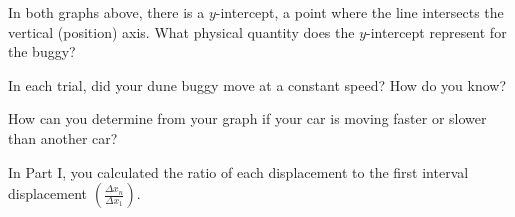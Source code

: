 \documentclass[]{exam}
\begin{document}
\begin{questions}
\ifprintanswers 
\else \fillwithlines{14mm}
\fi

\question
In both graphs above, there is a $y$-intercept, a point where the line intersects the vertical (position) axis. What physical quantity does the $y$-intercept represent for the buggy?

\ifprintanswers 
\else \fillwithlines{14mm}
\fi


\question
In each trial, did your dune buggy move at a constant speed? How do you know?

\ifprintanswers 
\else \fillwithlines{14mm}
\fi

\question
How can you determine from your graph if your car is moving faster or slower than another car?

\ifprintanswers 
\else \fillwithlines{14mm}
\fi


\question
In Part I, you calculated the ratio of each displacement to the first interval displacement $\displaystyle \left(\frac{\Delta x_n}{\Delta x_1}\right)$. 



\question

\end{questions}
\end{document}
